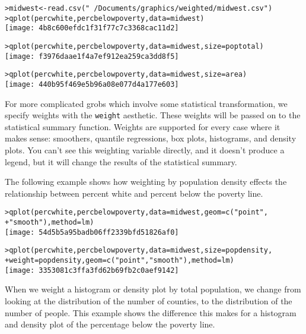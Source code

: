 \begin{alltt}
> midwest <- read.csv("~/Documents/graphics/weighted/midwest.csv")
> qplot(percwhite, percbelowpoverty, data = midwest)
\texttt{[image: 4b8c600efdc1f31f77c7c3368cac11d2]}

> qplot(percwhite, percbelowpoverty, data = midwest, size = poptotal)
\texttt{[image: f3976daae1f4a7ef912ea259ca3dd8f5]}

> qplot(percwhite, percbelowpoverty, data = midwest, size = area)
\texttt{[image: 440b95f469e5b96a08e077d4a177e603]}

\end{alltt}

For more complicated grobs which involve some statistical transformation, we specify weights with the {\tt weight} aesthetic.  These weights will be passed on to the statistical summary function.  Weights are supported for every case where it makes sense: smoothers, quantile regressions, box plots, histograms, and density plots.  You can't see this weighting variable directly, and it doesn't produce a legend, but it will change the results of the statistical summary.

The following example shows how weighting by population density effects the relationship between percent white and percent below the poverty line.

\begin{alltt}
> qplot(percwhite, percbelowpoverty, data = midwest, geom = c("point", 
+     "smooth"), method = lm)
\texttt{[image: 54d5b5a95badb06ff2339bfd51826af0]}

> qplot(percwhite, percbelowpoverty, data = midwest, size = popdensity, 
+     weight = popdensity, geom = c("point", "smooth"), method = lm)
\texttt{[image: 3353081c3ffa3fd62b69fb2c0aef9142]}

\end{alltt}

When we weight a histogram or density plot by total population, we change from looking at the distribution of the number of counties, to the distribution of the number of people.  This example shows the difference this makes for a histogram and density plot of the percentage below the poverty line.

